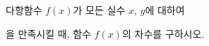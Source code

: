 다항함수 $f(x)$가 모든 실수 $x$, $y$에 대하여 \par\smallskip{}\par\smallskip\noindent 을 만족시킬 때, 함수 $f(x)$의 차수를 구하시오.
